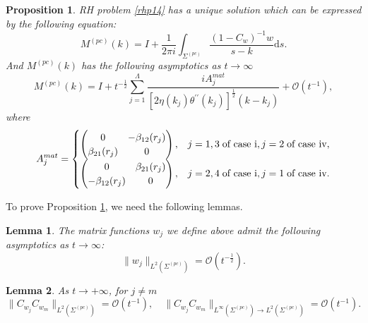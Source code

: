 \documentclass[11pt]{article}
\numberwithin{equation}{section}
\newtheorem{lemma}{Lemma}
\newtheorem{Proposition}{Proposition}
\begin{document}
\begin{Proposition}\label{p15}
    RH problem \ref{rhp14} has a unique solution which can be expressed by the following equation: \begin{equation*}
        M^{(pc)}(k) = I + \frac{1}{2\pi i} \int_{\Sigma^{(pc)}} \frac{(1 - C_w)^{-1}  w}{s - k} \mathrm{d}s.
    \end{equation*}
    And $M^{(pc)}(k)$ has the following asymptotics as $t\to\infty$
    \begin{equation*}
        M^{(pc)}(k) = I + t^{-\frac{1}{2}} \sum_{j=1}^{\Lambda} \frac{i  A_j^{mat}}{\left[2  \eta(k_j)  \theta^{\prime\prime}(k_j)\right]^{\frac{1}{2}} (k - k_j)} + \mathcal{O}(t^{-1}),
    \end{equation*}
    where
    \begin{equation}\label{eq29}
        A_j^{mat} =
        \begin{cases}
           \begin{pmatrix}
0 & -\beta_{12}(r_j)\\
\beta_{21}(r_j) & 0
\end{pmatrix}, & j=1,3 \;\textup{of case \uppercase\expandafter{\romannumeral1}} ,j=2 \;\textup{of case \uppercase\expandafter{\romannumeral4}}, \\
 \begin{pmatrix}
0 & \beta_{21}(r_j)\\
-\beta_{12}(r_j) & 0
\end{pmatrix}, & j=2,4 \;\textup{of case \uppercase\expandafter{\romannumeral1}} ,j=1 \;\textup{of case \uppercase\expandafter{\romannumeral4}}.
        \end{cases}
    \end{equation}
\end{Proposition}

To prove Proposition \ref{p15}, we need the following lemmas.
\begin{lemma}\label{l4}
    The matrix functions $w_{j}$ we define above admit the following asymptotics as $t\to\infty$:
\begin{equation*}
    \| w_{j} \|_{L^2(\Sigma^{(pc)})} = \mathcal{O}(t^{-\frac{1}{2}}).
\end{equation*}
\end{lemma}

\begin{lemma}\label{l5}
    As $t \to +\infty$, for $j \neq m$
\begin{equation*}
    \|C_{w_j} C_{w_m}\|_{L^2(\Sigma^{(pc)})} = \mathcal{O}(t^{-1}), \quad
\|C_{w_j} C_{w_m}\|_{L^\infty(\Sigma^{(pc)}) \to L^2(\Sigma^{(pc)})} = \mathcal{O}(t^{-1}).
\end{equation*}
\end{lemma}
\end{document}

